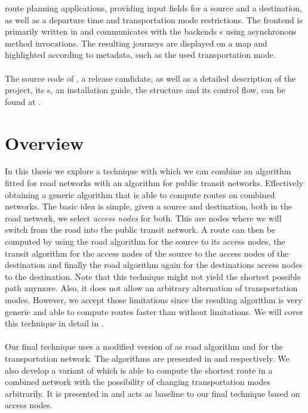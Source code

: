 	route planning applications, providing input fields for a source and a destination, as well as a departure time and transportation mode
	restrictions. The frontend is primarily written in \js and communicates with the backends {\restApi}s using asynchronous method invocations.
	The resulting journeys are displayed on a map and highlighted according to metadata, such as the used transportation mode.\\\\
	The source code of \cobweb, a release candidate, as well as a detailed description of the project, its {\api}s, an installation guide,
	the structure and its control flow, can be found at .
	
\section{Overview}
	In this thesis we explore a technique with which we can combine an algorithm fitted for road networks with an algorithm
	for public transit networks. Effectively obtaining a generic algorithm that is able to compute routes on combined networks.
	The basic idea is simple, given a source and destination, both in the road network, we select \textit{access nodes} for both.
	This are nodes where we will switch from the road into the public transit network. A route can then be computed by
	using the road algorithm for the source to its access nodes, the transit algorithm for the access nodes of the source
	to the access nodes of the destination and finally the road algorithm again for the destinations access nodes to
	the destination. Note that this technique might not yield the shortest possible path anymore. Also, it does not allow
	an arbitrary alternation of transportation modes. However, we accept those limitations since the resulting
	algorithm is very generic and able to compute routes faster than without limitations. We will cover this technique in detail
	in .\\\\
	Our final technique uses a modified version of \alt {} as road algorithm and \csa {} for the transportation network.
	The algorithms are presented in  and  respectively.
	We also develop a \multiModal variant of \dijkstra {} which is able to compute the shortest route in a combined
	network with the possibility of changing transportation modes arbitrarily. It is presented in 
	and acts as baseline to our final technique based on access nodes.
	
